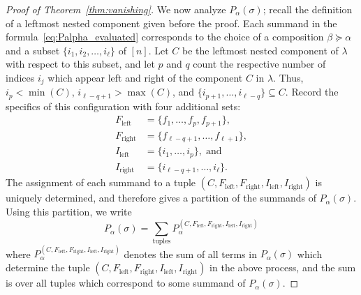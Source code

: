 \documentclass[12pt]{amsart}
\theoremstyle{definition}
\theoremstyle{remark}
\numberwithin{equation}{section}
\begin{document}
\begin{proof}[Proof of Theorem~\ref{thm:vanishing}]
We now analyze $P_{\alpha}(\sigma)$; recall the definition of a leftmost nested component given before the proof.  
Each summand in the formula~\eqref{eq:Palpha_evaluated} corresponds to the choice of a composition $\beta \succeq \alpha$ and a subset $\{i_{1}, i_{2}, \ldots, i_{\ell}\}$ of $[n]$.  
Let $C$ be the leftmost nested component of $\lambda$ with respect to this subset, and let $p$ and $q$ count the respective number of indices $i_{j}$ which appear left and right of the component $C$ in $\lambda$.  
Thus, $i_{p} < \min(C)$, $i_{\ell - q+1} > \max(C)$, and $\{i_{p+1}, \ldots, i_{\ell - q}\} \subseteq C$.  
Record the specifics of this configuration with four additional sets:
\begin{align*}
F_{\text{left}} &= \{f_{1}, \ldots, f_{p}, f_{p+1}\}, \\
F_{\text{right}} &= \{f_{\ell - q+1}, \ldots, f_{\ell+1}\}, \\
I_{\text{left}} &= \{i_{1}, \ldots, i_{p}\},\;\text{and} \\ 
I_{\text{right}} &= \{i_{\ell - q+1}, \ldots, i_{\ell}\}.
\end{align*}  
The assignment of each summand to a tuple $(C, F_{\text{left}}, F_{\text{right}}, I_{\text{left}}, I_{\text{right}})$ is uniquely determined, and therefore gives a partition of the summands of $P_{\alpha}(\sigma)$.  Using this partition, we write
\[
P_{\alpha}(\sigma) = \sum_{\text{tuples}} P_{\alpha}^{(C, F_{\text{left}}, F_{\text{right}}, I_{\text{left}}, I_{\text{right}})}
\]
where $P_{\alpha}^{(C, F_{\text{left}}, F_{\text{right}}, I_{\text{left}}, I_{\text{right}})}$ denotes the sum of all terms in $P_{\alpha}(\sigma)$ which determine the tuple $(C, F_{\text{left}}, F_{\text{right}}, I_{\text{left}}, I_{\text{right}})$ in the above process, and the sum is over all tuples which correspond to some summand of $P_{\alpha}(\sigma)$.  


\end{proof}
\end{document}
